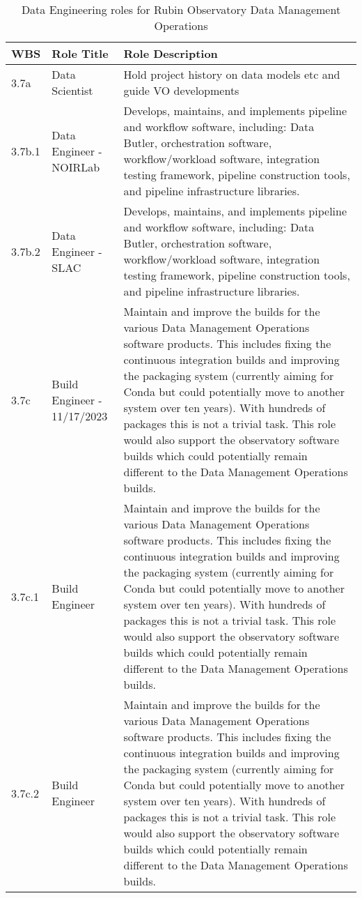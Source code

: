 \normalsize \begin{longtable} {|p{}|p{}|p{}|} \caption{Data Engineering roles for Rubin Observatory Data Management Operations \label{tab:deroles}}\\ 
\hline 
\textbf{WBS}&\textbf{Role Title}&\textbf{Role Description} \\ \hline
{3.7a}&{Data Scientist}&{Hold project history on data models etc and guide VO developments} \\ \hline
{3.7b.1}&{Data Engineer - NOIRLab}&{Develops, maintains, and implements pipeline and workflow software, including: Data Butler, orchestration software, workflow/workload software, integration testing framework, pipeline construction tools, and pipeline infrastructure libraries.} \\ \hline
{3.7b.2}&{Data Engineer - SLAC}&{Develops, maintains, and implements pipeline and workflow software, including: Data Butler, orchestration software, workflow/workload software, integration testing framework, pipeline construction tools, and pipeline infrastructure libraries.} \\ \hline
{3.7c}&{Build Engineer  - 11/17/2023}&{Maintain and improve the builds for the various Data Management Operations software products. This includes fixing the continuous integration builds and improving the packaging system (currently aiming for Conda but could potentially move to another system over ten years). With hundreds of packages this is not a trivial task. This role would also support the observatory software builds which could potentially remain different to the Data Management Operations builds.} \\ \hline
{3.7c.1}&{Build Engineer }&{Maintain and improve the builds for the various Data Management Operations software products. This includes fixing the continuous integration builds and improving the packaging system (currently aiming for Conda but could potentially move to another system over ten years). With hundreds of packages this is not a trivial task. This role would also support the observatory software builds which could potentially remain different to the Data Management Operations builds.} \\ \hline
{3.7c.2}&{Build Engineer }&{Maintain and improve the builds for the various Data Management Operations software products. This includes fixing the continuous integration builds and improving the packaging system (currently aiming for Conda but could potentially move to another system over ten years). With hundreds of packages this is not a trivial task. This role would also support the observatory software builds which could potentially remain different to the Data Management Operations builds.} \\ \hline
\end{longtable} \normalsize

